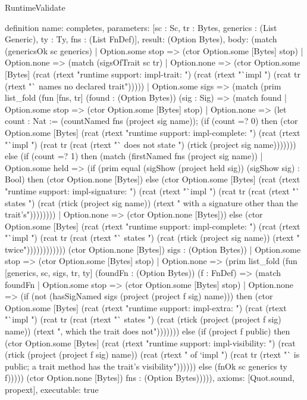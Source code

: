 \begin{lexlean}{RuntimeValidate}
\begin{semanticmodule}
definition{
  name: completes,
  parameters: [sc : Sc, tr : Bytes, generics : (List Generic), ty : Ty, fns : (List FnDef)],
  result: (Option Bytes),
  body: (match (genericsOk sc generics)
    | Option.some stop => (ctor Option.some [Bytes] stop)
    | Option.none => (match (sigsOfTrait sc tr)
      | Option.none => (ctor Option.some [Bytes] (rcat (rtext "runtime support: impl-trait: ") (rcat (rtext "`impl ") (rcat tr (rtext "` names no declared trait")))))
      | Option.some sigs => (match (prim list_fold (fun [fns, tr] (found : (Option Bytes)) (sig : Sig) => (match found
          | Option.some stop => (ctor Option.some [Bytes] stop)
          | Option.none => (let count : Nat := (countNamed fns (project sig name)); (if (count =? 0) then (ctor Option.some [Bytes] (rcat (rtext "runtime support: impl-complete: ") (rcat (rtext "`impl ") (rcat tr (rcat (rtext "` does not state ") (rtick (project sig name))))))) else (if (count =? 1) then (match (firstNamed fns (project sig name))
            | Option.some held => (if (prim equal (sigShow (project held sig)) (sigShow sig) : Bool) then (ctor Option.none [Bytes]) else (ctor Option.some [Bytes] (rcat (rtext "runtime support: impl-signature: ") (rcat (rtext "`impl ") (rcat tr (rcat (rtext "` states ") (rcat (rtick (project sig name)) (rtext " with a signature other than the trait's"))))))))
            | Option.none => (ctor Option.none [Bytes])) else (ctor Option.some [Bytes] (rcat (rtext "runtime support: impl-complete: ") (rcat (rtext "`impl ") (rcat tr (rcat (rtext "` states ") (rcat (rtick (project sig name)) (rtext " twice")))))))))))) (ctor Option.none [Bytes]) sigs : (Option Bytes))
        | Option.some stop => (ctor Option.some [Bytes] stop)
        | Option.none => (prim list_fold (fun [generics, sc, sigs, tr, ty] (foundFn : (Option Bytes)) (f : FnDef) => (match foundFn
          | Option.some stop => (ctor Option.some [Bytes] stop)
          | Option.none => (if (not (hasSigNamed sigs (project (project f sig) name))) then (ctor Option.some [Bytes] (rcat (rtext "runtime support: impl-extra: ") (rcat (rtext "`impl ") (rcat tr (rcat (rtext "` states ") (rcat (rtick (project (project f sig) name)) (rtext ", which the trait does not"))))))) else (if (project f public) then (ctor Option.some [Bytes] (rcat (rtext "runtime support: impl-visibility: ") (rcat (rtick (project (project f sig) name)) (rcat (rtext " of `impl ") (rcat tr (rtext "` is public; a trait method has the trait's visibility")))))) else (fnOk sc generics ty f))))) (ctor Option.none [Bytes]) fns : (Option Bytes))))),
  axioms: [Quot.sound, propext],
  executable: true
}


\end{semanticmodule}
\end{lexlean}
